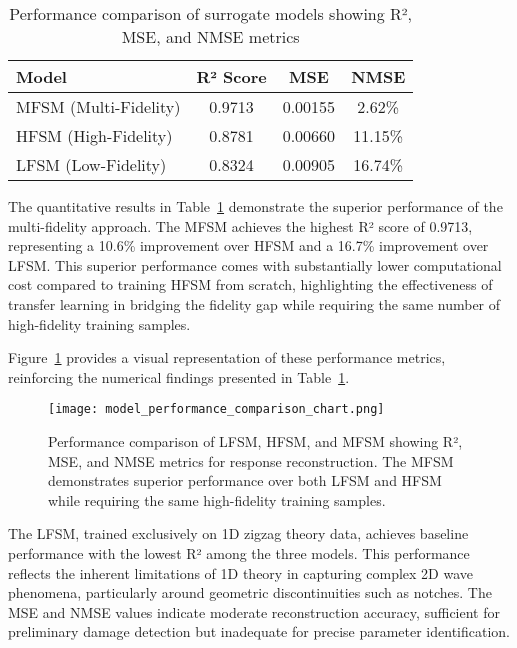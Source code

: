 \documentclass[12pt,a4paper]{report}
\begin{document}
\begin{table}[htbp]
\centering
\caption{Performance comparison of surrogate models showing R², MSE, and NMSE metrics}
\label{tab:model_performance}
\begin{tabular}{lccc}
\hline
\textbf{Model} & \textbf{R² Score} & \textbf{MSE} & \textbf{NMSE} \\
\hline
MFSM (Multi-Fidelity) & 0.9713 & 0.00155 & 2.62\% \\
HFSM (High-Fidelity)  & 0.8781 & 0.00660 & 11.15\% \\
LFSM (Low-Fidelity)   & 0.8324 & 0.00905 & 16.74\% \\
\hline
\end{tabular}
\end{table}

The quantitative results in Table~\ref{tab:model_performance} demonstrate the superior performance of the multi-fidelity approach. The MFSM achieves the highest R² score of 0.9713, representing a 10.6\% improvement over HFSM and a 16.7\% improvement over LFSM. This superior performance comes with substantially lower computational cost compared to training HFSM from scratch, highlighting the effectiveness of transfer learning in bridging the fidelity gap while requiring the same number of high-fidelity training samples.

Figure~\ref{fig:model_performance_comparison} provides a visual representation of these performance metrics, reinforcing the numerical findings presented in Table~\ref{tab:model_performance}.

\begin{figure}[htbp]
\centering
\texttt{[image: model\_performance\_comparison\_chart.png]}
\caption{Performance comparison of LFSM, HFSM, and MFSM showing R², MSE, and NMSE metrics for response reconstruction. The MFSM demonstrates superior performance over both LFSM and HFSM while requiring the same high-fidelity training samples.}
\label{fig:model_performance_comparison}
\end{figure}

The LFSM, trained exclusively on 1D zigzag theory data, achieves baseline performance with the lowest R² among the three models. This performance reflects the inherent limitations of 1D theory in capturing complex 2D wave phenomena, particularly around geometric discontinuities such as notches. The MSE and NMSE values indicate moderate reconstruction accuracy, sufficient for preliminary damage detection but inadequate for precise parameter identification.
\end{document}
